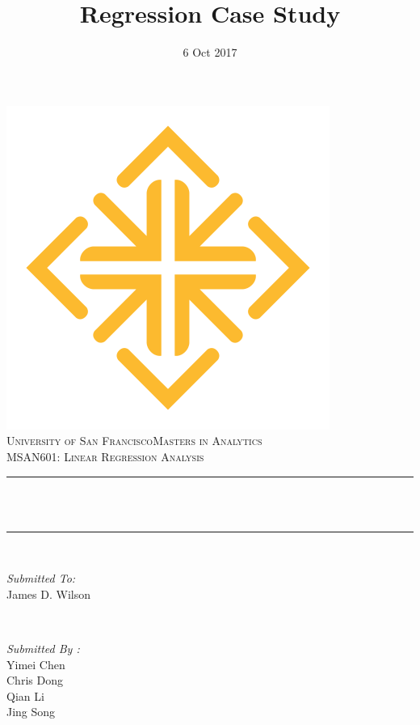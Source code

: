 \documentclass[12pt]{article}
\title{Regression Case Study}								%
\date{6 Oct 2017}											%
\makeatletter
\let\thetitle\@title
\makeatother
\begin{document}

\begin{titlepage}
	\centering
    \vspace*{0.5 cm}
    \includegraphics[scale = 0.5]{logo.png}\\[1.0 cm]	%
    \textsc{\LARGE University of San Francisco\newline\newline Masters in Analytics}\\[2.0 cm]	%
	\textsc{\Large MSAN601: Linear Regression Analysis}\\[0.5 cm]				%
	\rule{\linewidth}{0.2 mm} \\[0.4 cm]
	{ \huge \bfseries \thetitle}\\
	\rule{\linewidth}{0.2 mm} \\[1.5 cm]
	
	\begin{minipage}{0.4\textwidth}
		\begin{flushleft} \large
			\emph{Submitted To:}\\
			James D. Wilson
			
			\end{flushleft}
			\end{minipage}~
			\begin{minipage}{0.4\textwidth}
            
			\begin{flushright} \large
			\emph{Submitted By :} \\
			Yimei Chen\\
            Chris Dong\\
            Qian Li\\
            Jing Song\\
		\end{flushright}
        
	\end{minipage}\\[2 cm]
	
\end{titlepage}
\end{document}
